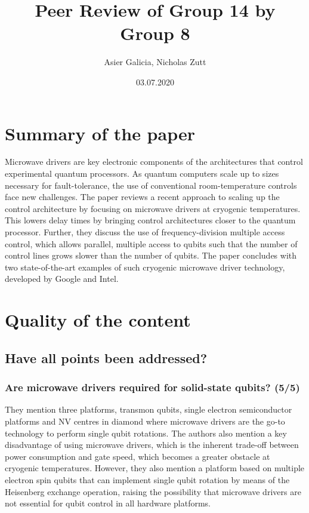 \documentclass[11pt]{article}
\author{Asier Galicia, Nicholas Zutt}
\date{03.07.2020}
\title{Peer Review of Group 14 by Group 8}
\begin{document}
\maketitle

\section{Summary of the paper}

Microwave drivers are key electronic components of the architectures that
control experimental quantum processors. As quantum computers scale up to sizes
necessary for fault-tolerance, the use of conventional room-temperature controls
face new challenges. The paper reviews a recent approach to scaling up the
control architecture by focusing on microwave drivers at cryogenic temperatures.
This lowers delay times by bringing control architectures closer to the quantum
processor. Further, they discuss the use of frequency-division multiple access
control, which allows parallel, multiple access to qubits such that the number
of control lines grows slower than the number of qubits. The paper concludes
with two state-of-the-art examples of such cryogenic microwave driver
technology, developed by Google and Intel.

\section{Quality of the content}

\subsection{Have all points been addressed?}

\subsubsection{Are microwave drivers required for solid-state qubits? (5/5)}

They mention three platforms, transmon qubits, single electron semiconductor
platforms and NV centres in diamond where microwave drivers are the go-to
technology to perform single qubit rotations. The authors also mention a key
disadvantage of using microwave drivers, which is the inherent trade-off between
power consumption and gate speed, which becomes a greater obstacle at cryogenic
temperatures. However, they also mention a platform based on multiple electron
spin qubits that can implement single qubit rotation by means of the Heisenberg
exchange operation, raising the possibility that microwave drivers are not
essential for qubit control in all hardware platforms.
\end{document}
